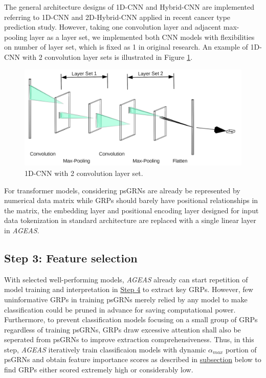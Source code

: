 \documentclass[fleqn,10pt]{wlscirep}
\begin{document}
    The general architecture designs of 1D-CNN and Hybrid-CNN are implemented referring to 1D-CNN and 2D-Hybrid-CNN applied in recent cancer type prediction study\cite{mostavi_chiu_huang_chen_2020}.
    However, taking one convolution layer and adjacent max-pooling layer as a layer set, we implemented both CNN models with flexibilities on number of layer set, which is fixed as 1 in original research.
    An example of 1D-CNN with 2 convolution layer sets is illustrated in Figure \ref{1dCNN}.

    \begin{figure}[ht]
      \centering
      \includegraphics[width=0.8\linewidth]{../images/nn.png}
      \caption{1D-CNN with 2 convolution layer set.}
      \label{1dCNN}
    \end{figure}

    For transformer models, considering psGRNs are already be represented by numerical data matrix while GRPs should barely have positional relationships in the matrix, the embedding layer and positional encoding layer designed for input data tokenization in standard architecture \cite{transformer} are replaced with a single linear layer in \emph{AGEAS}.

  \subsection*{Step 3: Feature selection}
    \label{step3}
    With selected well-performing models, \emph{AGEAS} already can start repetition of model training and interpretation in \hyperref[step4]{Step 4} to extract key GRPs.
    However, few uninformative GRPs in training psGRNs merely relied by any model to make classification could be pruned in advance for saving computational power.
    Furthermore, to prevent classification models focusing on a small group of GRPs regardless of training psGRNs, GRPs draw excessive attention shall also be seperated from psGRNs to improve extraction comprehensiveness.
    Thus, in this step, \emph{AGEAS} iteratively train classificaion models with dynamic $\alpha_{max}$ portion of psGRNs and obtain feature importance scores as described in \hyperref[features_importances]{subsection} below to find GRPs either scored extremely high or considerably low.
\end{document}
